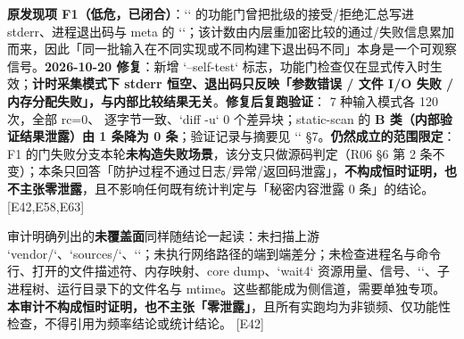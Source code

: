 \documentclass[UTF8,fontset=fandol,11pt,a4paper]{ctexart}
\begin{document}
\textbf{原发现项 F1（低危，已闭合）}：`\texttt{}` 的功能门曾把批级的接受/拒绝汇总写进 stderr、进程退出码与 meta 的 `\texttt{}`；该计数由内层重加密比较的通过/失败信息累加而来，因此「同一批输入在不同实现或不同构建下退出码不同」本身是一个可观察信号。\textbf{2026-10-20 修复}：新增 `--self-test` 标志，功能门检查仅在显式传入时生效；\textbf{计时采集模式下 stderr 恒空、退出码只反映「参数错误 / 文件 I/O 失败 / 内存分配失败」，与内部比较结果无关}。\textbf{修复后复跑验证}：\texttt{} 7 种输入模式各 120 次，全部 rc=0、\texttt{} 逐字节一致、`diff -u` 0 个差异块；static-scan 的 \textbf{B 类（内部验证结果泄露）由 1 条降为 0 条}；验证记录与摘要见 `\texttt{}` §7。\textbf{仍然成立的范围限定}：F1 的门失败分支本轮\textbf{未构造失败场景}，该分支只做源码判定（R06 §6 第 2 条不变）；本条只回答「防护过程不通过日志/异常/返回码泄露」，\textbf{不构成恒时证明，也不主张零泄露}，且不影响任何既有统计判定与「秘密内容泄露 0 条」的结论。 [E42,E58,E63]


审计明确列出的\textbf{未覆盖面}同样随结论一起读：未扫描上游 `vendor/`、`sources/`、`\texttt{}`；未执行网络路径的端到端差分；未检查进程名与命令行、打开的文件描述符、内存映射、core dump、`wait4` 资源用量、信号、`\texttt{}`、子进程树、运行目录下的文件名与 mtime。这些都能成为侧信道，需要单独专项。\textbf{本审计不构成恒时证明，也不主张「零泄露」}，且所有实跑均为非锁频、仅功能性检查，不得引用为频率结论或统计结论。 [E42]
\end{document}
